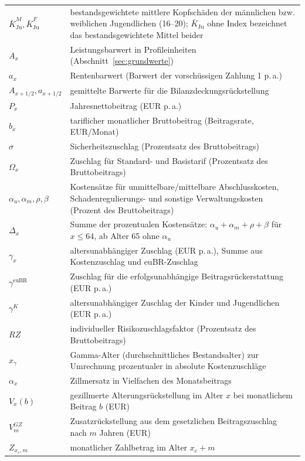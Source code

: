 \begin{center}
\begin{longtable}{@{}lp{13.5cm}@{}}
$\bar{K}^{M}_{\mathrm{Ju}}, \bar{K}^{F}_{\mathrm{Ju}}$ & bestandsgewichtete mittlere Kopfschäden der männlichen bzw. weiblichen Jugendlichen (16--20); $\bar{K}_{\mathrm{Ju}}$ ohne Index bezeichnet das bestandsgewichtete Mittel beider \\
$A_x$ & Leistungsbarwert in Profileinheiten (Abschnitt~\ref{sec:grundwerte}) \\
$a_x$ & Rentenbarwert (Barwert der vorschüssigen Zahlung 1 p.\,a.) \\
$A_{x+1/2}, a_{x+1/2}$ & gemittelte Barwerte für die Bilanzdeckungsrückstellung \\
$P_x$ & Jahresnettobeitrag (EUR p.\,a.) \\
$b_x$ & tariflicher monatlicher Bruttobeitrag (Beitragsrate, EUR/Monat) \\
$\sigma$ & Sicherheitszuschlag (Prozentsatz des Bruttobeitrags) \\
$\Omega_x$ & Zuschlag für Standard- und Basistarif (Prozentsatz des Bruttobeitrags) \\
$\alpha_u, \alpha_m, \rho, \beta$ & Kostensätze für unmittelbare/mittelbare Abschlusskosten, Schadenregulierungs- und sonstige Verwaltungskosten (Prozent des Bruttobeitrags) \\
$\Delta_x$ & Summe der prozentualen Kostensätze: $\alpha_u + \alpha_m + \rho + \beta$ für $x \le 64$, ab Alter 65 ohne $\alpha_u$ \\
$\gamma_x$ & altersunabhängiger Zuschlag (EUR p.\,a.), Summe aus Kostenzuschlag und euBR-Zuschlag \\
$\gamma^{\mathrm{euBR}}$ & Zuschlag für die erfolgsunabhängige Beitragsrückerstattung (EUR p.\,a.) \\
$\gamma^{K}$ & altersunabhängiger Zuschlag der Kinder und Jugendlichen (EUR p.\,a.) \\
$RZ$ & individueller Risikozuschlagsfaktor (Prozentsatz des Bruttobeitrags) \\
$x_\gamma$ & Gamma-Alter (durchschnittliches Bestandsalter) zur Umrechnung prozentualer in absolute Kostenzuschläge \\
$\alpha_x$ & Zillmersatz in Vielfachen des Monatsbeitrags \\
$V_{x}(b)$ & gezillmerte Alterungsrückstellung im Alter $x$ bei monatlichem Beitrag $b$ (EUR) \\
$V^{GZ}_{m}$ & Zusatzrückstellung aus dem gesetzlichen Beitragszuschlag nach $m$ Jahren (EUR) \\
$Z_{x_e,m}$ & monatlicher Zahlbetrag im Alter $x_e+m$ \\

\end{longtable}
\end{center}
